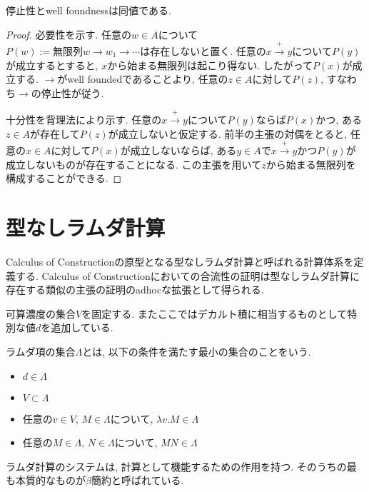\documentclass{ltjsarticle}
\begin{document}
\begin{thm}
 停止性とwell foundnessは同値である.
\end{thm}

\begin{proof}
 必要性を示す. 任意の$w \in A$について$P(w):= \text{無限列} w \rightarrow w_1 \rightarrow \cdots \text{は存在しない}$と置く. 任意の$x \xrightarrow{+} y$について$P(y)$が成立するとすると, $x$から始まる無限列は起こり得ない. したがって$P(x)$が成立する. $\rightarrow$がwell foundedであることより, 任意の$z \in A$に対して$P(z)$, すなわち$\rightarrow$の停止性が従う.
 
 十分性を背理法により示す. 任意の$x \xrightarrow{+} y$について$P(y)$ならば$P(x)$かつ, ある$z \in A$が存在して$P(z)$が成立しないと仮定する. 前半の主張の対偶をとると, 任意の$x \in A$に対して$P(x)$が成立しないならば, ある$y \in A$で$x \xrightarrow{+} y$かつ$P(y)$が成立しないものが存在することになる. この主張を用いて$z$から始まる無限列を構成することができる.
\end{proof}

\section{型なしラムダ計算}
Calculus of Constructionの原型となる型なしラムダ計算と呼ばれる計算体系を定義する. Calculus of Constructionにおいての合流性の証明は型なしラムダ計算に存在する類似の主張の証明のadhocな拡張として得られる.

可算濃度の集合$V$を固定する. またここではデカルト積に相当するものとして特別な値$d$を追加している.

\begin{defn}
 ラムダ項の集合$\Lambda$とは, 以下の条件を満たす最小の集合のことをいう.
 \begin{itemize}
  \item $d \in \Lambda$
  \item $V \subset \Lambda$
  \item 任意の$v \in V$, $M \in \Lambda$について, $\lambda v. M \in \Lambda$
  \item 任意の$M \in \Lambda$, $N \in \Lambda$について, $M N \in \Lambda$
 \end{itemize}
\end{defn}

ラムダ計算のシステムは, 計算として機能するための作用を持つ. そのうちの最も本質的なものが$\beta$簡約と呼ばれている.
\end{document}
